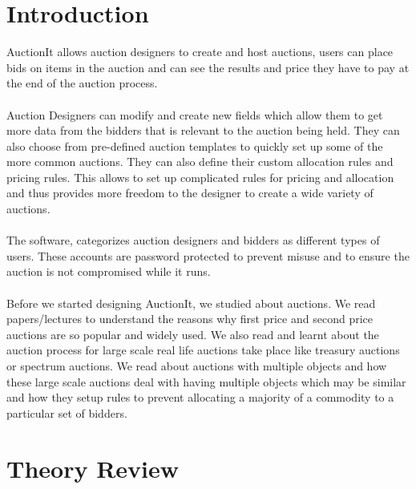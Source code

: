 \documentclass[a4paper]{article}
\begin{document}
\section*{Introduction}
AuctionIt allows auction designers to create and host auctions, users can place bids on items in the auction and can see the results and price they have to pay at the end of the auction process.
\\\\ Auction Designers can modify and create new fields which allow them to get more data from the bidders that is relevant to the auction being held. They can also choose from pre-defined auction templates to quickly set up some of the more common auctions. They can also define their custom allocation rules and pricing rules. This allows to set up complicated rules for pricing and allocation and thus provides more freedom to the designer to create a wide variety of auctions. 
\\\\
The software, categorizes auction designers and bidders as different types of users. These accounts are password protected to prevent misuse and to ensure the auction is not compromised while it runs.
\\\\
Before we started designing AuctionIt, we studied about auctions. We read papers/lectures to understand the reasons why first price and second price auctions are so popular and widely used. We also read and learnt about the auction process for large scale real life auctions take place like treasury auctions or spectrum auctions. We read about auctions with multiple objects and how these large scale auctions deal with having multiple objects which may be similar and how they setup rules to prevent allocating a majority of a commodity to a particular set of bidders.
\section*{Theory Review}
\end{document}
